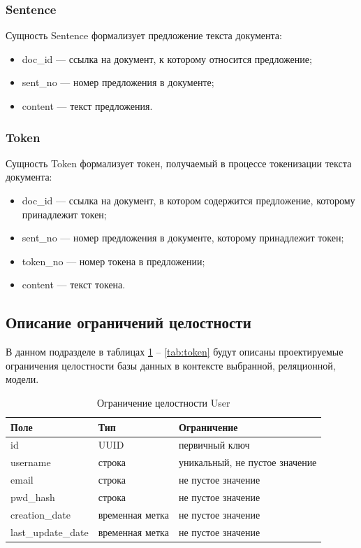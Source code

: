 \subsubsection*{Sentence}

Сущность Sentence формализует предложение текста документа:
\begin{itemize}
    \item doc\_id --- ссылка на документ, к которому относится предложение;
    \item sent\_no --- номер предложения в документе;
    \item content --- текст предложения.
\end{itemize}

\subsubsection*{Token}

Сущность Token формализует токен, получаемый в процессе токенизации текста документа:
\begin{itemize}
    \item doc\_id --- ссылка на документ, в котором содержится предложение, которому принадлежит токен;
    \item sent\_no --- номер предложения в документе, которому принадлежит токен;
    \item token\_no --- номер токена в предложении;
    \item content --- текст токена.
\end{itemize}

\subsection{Описание ограничений целостности}

В данном подразделе в таблицах \ref{tab:user} -- \ref{tab:token} будут описаны проектируемые ограничения целостности базы данных в контексте выбранной, реляционной, модели.

\begin{table}[H]
\centering
\caption{Ограничение целостности User}
\begin{tabular}{|m{4cm}|m{3cm}|m{6cm}|}
\hline
\textbf{Поле} & \textbf{Тип} & \textbf{Ограничение} \\ \hline
id & UUID & первичный ключ \\ \hline
username & строка & уникальный, не пустое значение \\ \hline
email & строка & не пустое значение \\ \hline
pwd\_hash & строка & не пустое значение \\ \hline
creation\_date & временная метка & не пустое значение \\ \hline
last\_update\_date & временная метка & не пустое значение \\ \hline
\end{tabular}
\label{tab:user}
\end{table}


